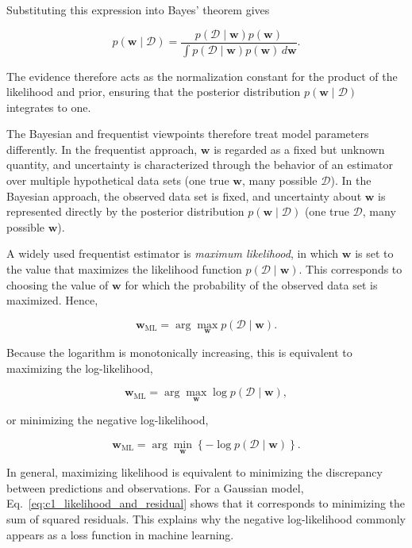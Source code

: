 \documentclass[10pt,twocolumn]{memoir}
\begin{document}
Substituting this expression into Bayes' theorem gives

\begin{equation}
    p(\mathbf{w}\mid\mathcal{D}) = \frac{p(\mathcal{D}\mid\mathbf{w})p(\mathbf{w})}{\int p(\mathcal{D}\mid\mathbf{w})p(\mathbf{w}) \, d\mathbf{w}}.
\label{eq:c1_bayes_normalization}
\end{equation}

The evidence therefore acts as the normalization constant for the product of the likelihood and prior, ensuring that the posterior distribution $p(\mathbf{w}\mid\mathcal{D})$ integrates to one.

The Bayesian and frequentist viewpoints therefore treat model parameters differently. In the frequentist approach, $\mathbf{w}$ is regarded as a fixed but unknown quantity, and uncertainty is characterized through the behavior of an estimator over multiple hypothetical data sets (one true $\mathbf{w}$, many possible $\mathcal{D}$). In the Bayesian approach, the observed data set is fixed, and uncertainty about $\mathbf{w}$ is represented directly by the posterior distribution $p(\mathbf{w}\mid\mathcal{D})$ (one true $\mathcal{D}$, many possible $\mathbf{w}$).

A widely used frequentist estimator is \textit{maximum likelihood}, in which $\mathbf{w}$ is set to the value that maximizes the likelihood function $p(\mathcal{D}\mid\mathbf{w})$. This corresponds to choosing the value of $\mathbf{w}$ for which the probability of the observed data set is maximized. Hence,

\begin{equation}
    \mathbf{w}_{\mathrm{ML}} = \arg\max_{\mathbf{w}} p(\mathcal{D}\mid\mathbf{w}).
\end{equation}

Because the logarithm is monotonically increasing, this is equivalent to maximizing the log-likelihood,

\begin{equation}
    \mathbf{w}_{\mathrm{ML}} = \arg\max_{\mathbf{w}} \log p(\mathcal{D}\mid\mathbf{w}),
\end{equation}

or minimizing the negative log-likelihood,

\begin{equation}
    \mathbf{w}_{\mathrm{ML}} = \arg\min_{\mathbf{w}} \left\{-\log p(\mathcal{D}\mid\mathbf{w})\right\}.
\end{equation}

In general, maximizing likelihood is equivalent to minimizing the discrepancy between predictions and observations. For a Gaussian model, Eq.~\ref{eq:c1_likelihood_and_residual} shows that it corresponds to minimizing the sum of squared residuals. This explains why the negative log-likelihood commonly appears as a loss function in machine learning.
\end{document}

